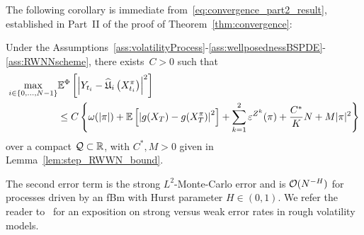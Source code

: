 The following corollary is immediate from~\eqref{eq:convergence_part2_result}, established in Part~II of the proof of Theorem~\ref{thm:convergence}:

\begin{corollary}\label{cor:convergence}
    Under the Assumptions~\ref{ass:volatilityProcess}-\ref{ass:wellposednessBSPDE}-\ref{ass:RWNNscheme},
    there exists~${C>0}$ such that
    \begin{align*}
    \max _{i\in\{0, \dots, N-1\}} & \mathbb{E}^\Phi\left[\left|Y_{t_i}-\widehat{\mathfrak{U}}_i\left(X^\pi_{t_i}\right)\right|^2\right] \\ & \leq C\left\{\omega(|\pi|) + \mathbb{E}\left[\left|g(X_T)-g(X^{\pi}_{T})\right|^2\right]+\sum_{k=1}^2\varepsilon^{Z^k}(\pi)+\frac{C^{*}}{K}N+ M|\pi|^2\right\}
    \end{align*}
    over a compact $\mathcal{Q}\subset \mathbb{R}$, with $C^*, M>0$ given in Lemma~\ref{lem:step_RWWN_bound}.
\end{corollary}

\begin{remark}
The second error term is the strong $L^2$-Monte-Carlo error and is $\mathcal{O}(N^{-H})$ for processes driven by an fBm with Hurst parameter $H\in(0, 1)$. 
We refer the reader to~\cite{Bonesini2023RoughConvergence, Gassiat2022WeakVolatility} for an exposition on strong versus weak error rates in rough volatility models.
\end{remark}

